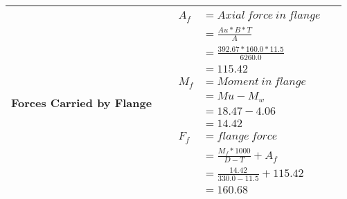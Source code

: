 \documentclass{article}%
\begin{document}
\begin{longtable}{|p{4cm}|p{5cm}|p{5.5cm}|p{1.5cm}|}
\hline%
Forces Carried by Flange&&$\begin{aligned} A_f&= Axial~force~ in ~flange  \\ &= \frac{Au * B *T}{A} \\ &= \frac{392.67 * 160.0*11.5}{6260.0} \\ &=115.42\\ M_f& =Moment~ in~ flange \\  & = Mu-M_w\\ &= 18.47-4.06\\ &=14.42\\  F_f& =flange~force  \\ & = \frac{M_f *1000}{D-T} + A_f \\ &= \frac{14.42}{330.0-11.5} +115.42 \\ &=160.68\end{aligned}$&\\%
\hline%
\end{longtable}

%
\newpage%
\end{document}
